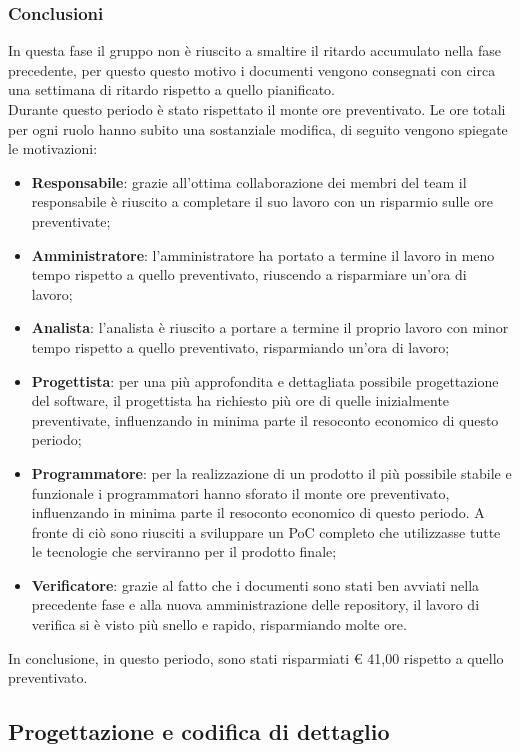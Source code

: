 \documentclass[../piano_di_progetto.tex]{subfiles}
\begin{document}
\subsubsection{Conclusioni}%
\label{sub:cons_con_3}
In questa fase il gruppo non è riuscito a smaltire il ritardo accumulato nella fase precedente, per questo questo motivo i documenti vengono consegnati con circa una settimana di ritardo rispetto a quello pianificato. \\
Durante questo periodo è stato rispettato il monte ore preventivato. Le ore totali per ogni ruolo hanno subito una sostanziale modifica, di seguito vengono spiegate le motivazioni:
\begin{itemize}
	\item \textbf{Responsabile}: grazie all'ottima collaborazione dei membri del team il responsabile è riuscito a completare il suo lavoro con un risparmio sulle ore preventivate;
	\item \textbf{Amministratore}: l'amministratore ha portato a termine il lavoro in meno tempo rispetto a quello preventivato, riuscendo a risparmiare un'ora di lavoro;
	\item \textbf{Analista}: l'analista è riuscito a portare a termine il proprio lavoro con minor tempo rispetto a quello preventivato, risparmiando un'ora di lavoro;
	\item \textbf{Progettista}: per una più approfondita e dettagliata possibile progettazione del software, il progettista ha richiesto più ore di quelle inizialmente preventivate, influenzando in minima parte il resoconto economico di questo periodo;
	\item \textbf{Programmatore}: per la realizzazione di un prodotto il più possibile stabile e funzionale i programmatori hanno sforato il monte ore preventivato, influenzando in minima parte il resoconto economico di questo periodo. A fronte di ciò sono riusciti a sviluppare un PoC completo che utilizzasse tutte le tecnologie che serviranno per il prodotto finale;
	\item \textbf{Verificatore}: grazie al fatto che i documenti sono stati ben avviati nella precedente fase e alla nuova amministrazione delle repository, il lavoro di verifica si è visto più snello e rapido, risparmiando molte ore.
\end{itemize} 
In conclusione, in questo periodo, sono stati risparmiati € 41,00 rispetto a quello preventivato.

\clearpage
\subsection{Progettazione e codifica di dettaglio}%
\label{sub:cons_prog_dettaglio}
\end{document}
